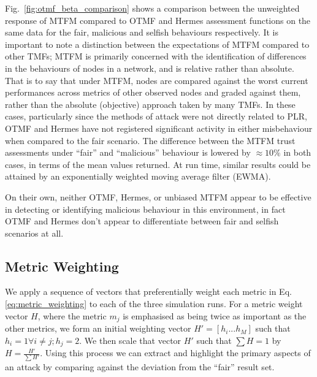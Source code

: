 Fig.~\ref{fig:otmf_beta_comparison} shows a comparison between the unweighted response of MTFM compared to OTMF and Hermes assessment functions on the same data for the fair, malicious and selfish behaviours respectively.
It is important to note a distinction between the expectations of MTFM compared to other TMFs; MTFM is primarily concerned with the identification of differences in the behaviours of nodes in a network, and is relative rather than absolute.
That is to say that under MTFM, nodes are compared against the worst current performances across metrics of other observed nodes and graded against them, rather than the absolute (objective) approach taken by many TMFs.
In these cases, particularly since the methods of attack were not directly related to PLR, OTMF and Hermes have not registered significant activity in either misbehaviour when compared to the fair scenario.
The difference between the MTFM trust assessments under ``fair'' and ``malicious'' behaviour is lowered by $\approx 10\%$ in both cases, in terms of the mean values returned.
At run time, similar results could be attained by an exponentially weighted moving average filter (EWMA).

On their own, neither OTMF, Hermes, or unbiased MTFM appear to be effective in detecting or identifying malicious behaviour in this environment, in fact OTMF and Hermes don't appear to differentiate between fair and selfish scenarios at all.


\subsection{Metric Weighting}
%

We apply a sequence of vectors that preferentially weight each metric in Eq. \eqref{eq:metric_weighting} to each of the three simulation runs.
For a metric weight vector $H$, where the metric $m_j$ is emphasised as being twice as important as the other metrics, we form an initial weighting vector $H'=[h_i...h_M]$ such that $h_i = 1 \forall i \ne j; h_j=2$. We then scale that vector $H'$ such that $\sum H = 1$ by $H= \frac{H'}{\sum H'}$.
Using this process we can extract and highlight the primary aspects of an attack by comparing against the deviation from the ``fair'' result set. 

